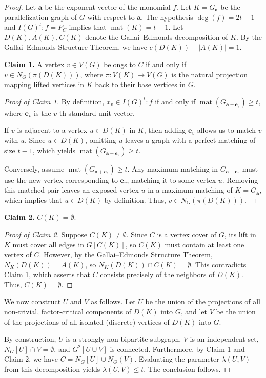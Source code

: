 \documentclass[12pt,reqno,twoside]{amsart}
\theoremstyle{definition}
\theoremstyle{plain}
\theoremstyle{remark}
\numberwithin{equation}{section}
\begin{document}
\begin{proof}
Let $\mathbf{a}$ be the exponent vector of the monomial $f$. Let $K = G_{\mathbf{a}}$ be the parallelization graph of $G$ with respect to $\mathbf{a}$. The hypothesis $\deg(f) = 2t-1$ and $I(G)^t : f = P_C$ implies that $\operatorname{mat}(K) = t-1$. Let $D(K), A(K), C(K)$ denote the Gallai--Edmonds decomposition of $K$. By the Gallai--Edmonds Structure Theorem, we have $c(D(K)) - |A(K)| = 1$.

\smallskip
\noindent\textbf{Claim 1.} A vertex $v \in V(G)$ belongs to $C$ if and only if $v \in N_G(\pi(D(K)))$, where $\pi: V(K) \to V(G)$ is the natural projection mapping lifted vertices in $K$ back to their base vertices in $G$.

\begin{proof}[Proof of Claim 1]
By definition, $x_v \in I(G)^t : f$ if and only if $\operatorname{mat}(G_{\mathbf{a} + \mathbf{e}_v}) \ge t$, where $\mathbf{e}_v$ is the $v$-th standard unit vector. 

If $v$ is adjacent to a vertex $u \in D(K)$ in $K$, then adding $\mathbf{e}_v$ allows us to match $v$ with $u$. Since $u \in D(K)$, omitting $u$ leaves a graph with a perfect matching of size $t-1$, which yields $\operatorname{mat}(G_{\mathbf{a} + \mathbf{e}_v}) \ge t$.

Conversely, assume $\operatorname{mat}(G_{\mathbf{a} + \mathbf{e}_v}) \ge t$. Any maximum matching in $G_{\mathbf{a} + \mathbf{e}_v}$ must use the new vertex corresponding to $\mathbf{e}_v$, matching it to some vertex $u$. Removing this matched pair leaves an exposed vertex $u$ in a maximum matching of $K = G_{\mathbf{a}}$, which implies that $u \in D(K)$ by definition. Thus, $v \in N_G(\pi(D(K)))$.
\end{proof}

\smallskip
\noindent\textbf{Claim 2.} $C(K) = \emptyset$.

\begin{proof}[Proof of Claim 2]
Suppose $C(K) \neq \emptyset$. Since $C$ is a vertex cover of $G$, its lift in $K$ must cover all edges in $G[C(K)]$, so $C(K)$ must contain at least one vertex of $C$. However, by the Gallai--Edmonds Structure Theorem, $N_K(D(K)) = A(K)$, so $N_K(D(K)) \cap C(K) = \emptyset$. This contradicts Claim 1, which asserts that $C$ consists precisely of the neighbors of $D(K)$. Thus, $C(K) = \emptyset$.
\end{proof}

We now construct $U$ and $V$ as follows. Let $U$ be the union of the projections of all non-trivial, factor-critical components of $D(K)$ into $G$, and let $V$ be the union of the projections of all isolated (discrete) vertices of $D(K)$ into $G$. 

By construction, $U$ is a strongly non-bipartite subgraph, $V$ is an independent set, $N_G[U] \cap V = \emptyset$, and $G^2[U \cup V]$ is connected. Furthermore, by Claim 1 and Claim 2, we have $C = N_G[U] \cup N_G(V)$. Evaluating the parameter $\lambda(U,V)$ from this decomposition yields $\lambda(U,V) \le t$. The conclusion follows.
\end{proof}
\end{document}
